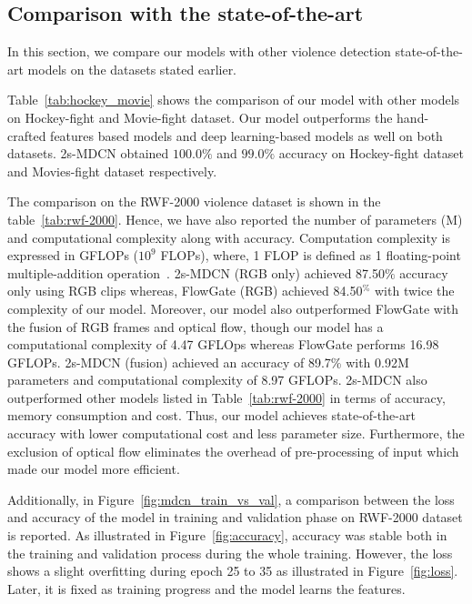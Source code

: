     \subsection{Comparison with the state-of-the-art}
    
      In this section, we compare our models with other violence detection state-of-the-art models on the datasets stated earlier.
      
      Table~\ref{tab:hockey_movie} shows the comparison of our model with other models on Hockey-fight and Movie-fight dataset. 
      Our model outperforms the hand-crafted features based models and deep learning-based models as well on both datasets. 
      2s-MDCN obtained ${100.0\%}$ and ${99.0\%}$ accuracy on Hockey-fight dataset and Movies-fight dataset respectively.
      
      The comparison on the RWF-2000 violence dataset is shown in the table~\ref{tab:rwf-2000}. 
      Hence, we have also reported the number of parameters (M) and computational complexity along with  accuracy. 
      Computation complexity is expressed in GFLOPs ($ {10}^{9} $ FLOPs), where, 1 FLOP is defined as 1 floating-point multiple-addition operation~\cite{zhang2018shufflenet}.
      2s-MDCN (RGB only) achieved 87.50$\%$ accuracy only using RGB clips whereas, FlowGate (RGB) achieved 84.50$^\%$ with twice the complexity of our model. 
      Moreover, our model also outperformed FlowGate with the fusion of RGB frames and optical flow, though our model has a computational complexity of 4.47 GFLOps whereas FlowGate performs 16.98 GFLOPs. 
      2s-MDCN (fusion) achieved an accuracy of 89.7\% with 0.92M parameters and computational complexity of 8.97 GFLOPs.
      2s-MDCN also outperformed other models listed in Table~\ref{tab:rwf-2000} in terms of accuracy, memory consumption and cost.
      Thus, our model achieves state-of-the-art accuracy with lower computational cost and less parameter size. 
      Furthermore, the exclusion of optical flow eliminates the overhead of pre-processing of input which made our model more efficient.
      
      Additionally, in Figure~\ref{fig:mdcn_train_vs_val}, a comparison between the loss and accuracy of the model in training and validation phase on RWF-2000 dataset is reported. 
    As illustrated in Figure~\ref{fig:accuracy}, accuracy was stable both in the training and validation process during the whole training. However, the loss shows a slight overfitting during epoch 25 to 35 as illustrated in Figure~\ref{fig:loss}. Later, it is fixed as training progress and the model learns the features.
      
